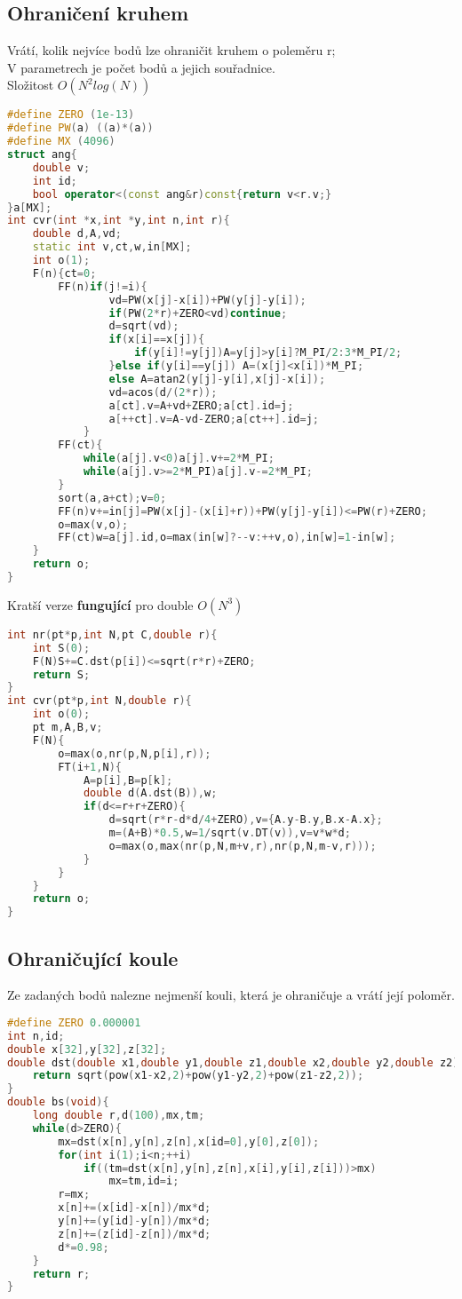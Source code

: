 \documentclass[11pt]{article}
\begin{document}
\subsection{Ohraničení kruhem}
Vrátí, kolik nejvíce bodů lze ohraničit kruhem o poleměru \textsf{r};
\\V parametrech je počet bodů a jejich souřadnice.
\\Složitost $O(N^2log(N))$
\begin{lstlisting}[language=C++]
#define ZERO (1e-13)
#define PW(a) ((a)*(a))
#define MX (4096)
struct ang{
    double v;
    int id;
    bool operator<(const ang&r)const{return v<r.v;}
}a[MX];
int cvr(int *x,int *y,int n,int r){
    double d,A,vd;
    static int v,ct,w,in[MX];
    int o(1);
    F(n){ct=0;
        FF(n)if(j!=i){
                vd=PW(x[j]-x[i])+PW(y[j]-y[i]);
                if(PW(2*r)+ZERO<vd)continue;
                d=sqrt(vd);
                if(x[i]==x[j]){
                    if(y[i]!=y[j])A=y[j]>y[i]?M_PI/2:3*M_PI/2;
                }else if(y[i]==y[j]) A=(x[j]<x[i])*M_PI;
                else A=atan2(y[j]-y[i],x[j]-x[i]);
                vd=acos(d/(2*r));
                a[ct].v=A+vd+ZERO;a[ct].id=j;
                a[++ct].v=A-vd-ZERO;a[ct++].id=j;
            }
        FF(ct){
            while(a[j].v<0)a[j].v+=2*M_PI;
            while(a[j].v>=2*M_PI)a[j].v-=2*M_PI;
        }
        sort(a,a+ct);v=0;
        FF(n)v+=in[j]=PW(x[j]-(x[i]+r))+PW(y[j]-y[i])<=PW(r)+ZERO;
        o=max(v,o);
        FF(ct)w=a[j].id,o=max(in[w]?--v:++v,o),in[w]=1-in[w];
    }
    return o;
}
\end{lstlisting}
Kratší verze \textbf{fungující} pro double $O(N^3)$
\begin{lstlisting}[language=C++]
int nr(pt*p,int N,pt C,double r){
    int S(0);
    F(N)S+=C.dst(p[i])<=sqrt(r*r)+ZERO;
    return S;
}
int cvr(pt*p,int N,double r){
    int o(0);
    pt m,A,B,v;
    F(N){
        o=max(o,nr(p,N,p[i],r));
        FT(i+1,N){
            A=p[i],B=p[k];
            double d(A.dst(B)),w;
            if(d<=r+r+ZERO){
                d=sqrt(r*r-d*d/4+ZERO),v={A.y-B.y,B.x-A.x};
                m=(A+B)*0.5,w=1/sqrt(v.DT(v)),v=v*w*d;
                o=max(o,max(nr(p,N,m+v,r),nr(p,N,m-v,r)));
            }
        }
    }
    return o;
}
\end{lstlisting}
\subsection{Ohraničující koule}
Ze zadaných bodů nalezne nejmenší kouli, která je ohraničuje a vrátí její poloměr.
\begin{lstlisting}[language=C++]
#define ZERO 0.000001
int n,id;
double x[32],y[32],z[32];
double dst(double x1,double y1,double z1,double x2,double y2,double z2){
    return sqrt(pow(x1-x2,2)+pow(y1-y2,2)+pow(z1-z2,2));
}
double bs(void){
    long double r,d(100),mx,tm;
    while(d>ZERO){
        mx=dst(x[n],y[n],z[n],x[id=0],y[0],z[0]);
        for(int i(1);i<n;++i)
            if((tm=dst(x[n],y[n],z[n],x[i],y[i],z[i]))>mx)
                mx=tm,id=i;
        r=mx;
        x[n]+=(x[id]-x[n])/mx*d;
        y[n]+=(y[id]-y[n])/mx*d;
        z[n]+=(z[id]-z[n])/mx*d;
        d*=0.98;
    }
    return r;
}
\end{lstlisting}
\end{document}
